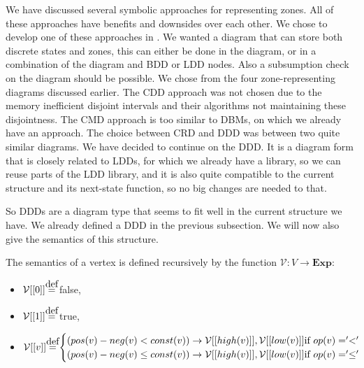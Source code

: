 We have discussed several symbolic approaches for representing zones. All of these approaches have benefits and downsides over each other. We chose to develop one of these approaches in \ltsmin{}. We wanted a diagram that can store both discrete states and zones, this can either be done in the diagram, or in a combination of the diagram and BDD or LDD nodes. Also a subsumption check on the diagram should be possible. We chose from the four zone-representing diagrams discussed earlier. The CDD approach was not chosen due to the memory inefficient disjoint intervals and their algorithms not maintaining these disjointness. The CMD approach is too similar to DBMs, on which we already have an approach. The choice between CRD and DDD was between two quite similar diagrams. We have decided to continue on the DDD. It is a diagram form that is closely related to LDDs, for which we already have a library, so we can reuse parts of the LDD library, and it is also quite compatible to the current \pins{} structure and its next-state function, so no big changes are needed to that. %

So DDDs are a diagram type that seems to fit well in the current structure we have. We already defined a DDD in the previous subsection. We will now also give the semantics of this structure. 

\begin{mydef}
\label{def:Semantics1}
The semantics of a vertex is defined recursively by the function $\mathcal{V}: V \rightarrow \textbf{Exp}:$
\begin{itemize}
\item $\mathcal{V}[[0]] \myeq$ false,
\item $\mathcal{V}[[1]] \myeq$ true,
\item \begin{math} \mathcal{V}[[v]] \myeq
\begin{cases}
(pos(v) - neg(v) < const(v)) \rightarrow \mathcal{V}[[high(v)]],\mathcal{V}[[low(v)]]\text{if }op(v) = '<'\\
(pos(v) - neg(v) \leq const(v)) \rightarrow \mathcal{V}[[high(v)]],\mathcal{V}[[low(v)]]\text{if }op(v) = '\leq'
\end{cases}
\end{math}
\end{itemize}
\end{mydef}

